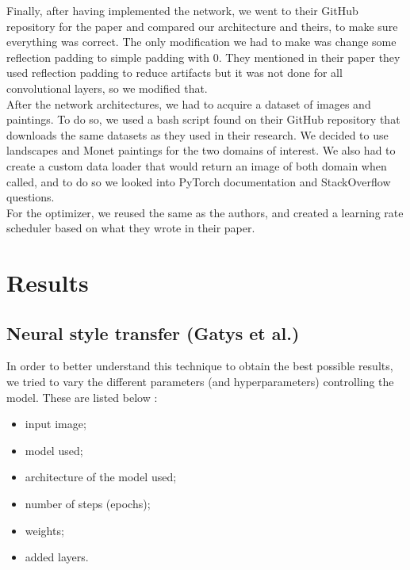 \documentclass[twocolumn,superscriptaddress,aps, floatfix]{revtex4-1}
\begin{document}
    Finally, after having implemented the network, we went to their GitHub repository for the paper and compared our architecture and theirs, to make sure everything was correct. The only modification we had to make was change some reflection padding to simple padding with 0. They mentioned in their paper they used reflection padding to reduce artifacts but it was not done for all convolutional layers, so we modified that.\\
    
    After the network architectures, we had to acquire a dataset of images and paintings. To do so, we used a bash script found on their GitHub repository that downloads the same datasets as they used in their research. We decided to use landscapes and Monet paintings for the two domains of interest. We also had to create a custom data loader that would return an image of both domain when called, and to do so we looked into PyTorch documentation and StackOverflow questions.\\
    
    For the optimizer, we reused the same as the authors, and created a learning rate scheduler based on what they wrote in their paper.
    
    
    
    
    \section{Results}
    
    \subsection{Neural style transfer (Gatys et al.)}\label{results.gatys}
    
    In order to better understand this technique to obtain the best possible results, we tried to vary the different parameters (and hyperparameters) controlling the model. These are listed below :
    
    \begin{itemize}
        \item input image;
        \item model used;
        \item architecture of the model used;
        \item number of steps (epochs);
        \item weights;
        \item added layers.
    \end{itemize}
    
\end{document}
